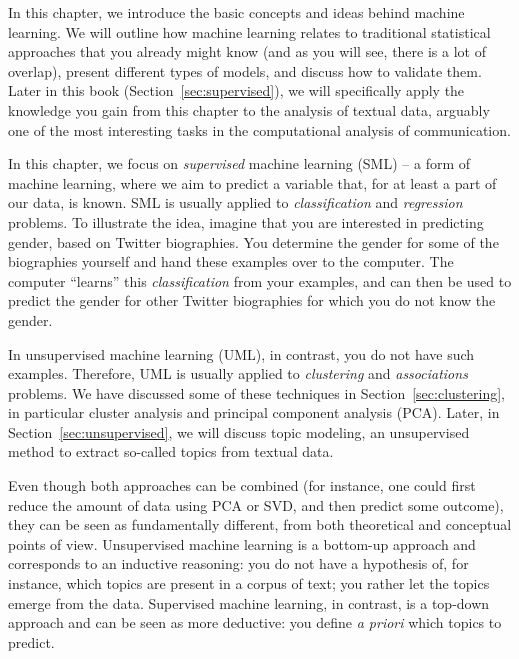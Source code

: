 In this chapter, we introduce the basic concepts and ideas behind
machine learning.  We will outline how machine learning relates to
traditional statistical approaches that you already might know (and as
you will see, there is a lot of overlap), present different types of
models, and discuss how to validate them.
Later in this book (Section~\ref{sec:supervised}), we will
specifically apply the knowledge you gain from this chapter to the
analysis of textual data, arguably one of the most interesting tasks
in the computational analysis of communication.

In this chapter, we focus on \emph{supervised} machine learning (SML)
-- a form of machine learning, where we aim to predict a variable
that, for at least a part of our data, is known. SML is usually applied to \textit{classification} and \textit{regression}  problems. To illustrate the 
idea, imagine that you are interested in predicting gender, based
on Twitter biographies. You determine the gender for some of the
biographies yourself and hand these examples over to the computer. The
computer ``learns'' this \textit{classification} from your examples, and can then be used to predict the gender for other Twitter biographies for which you do not
know the gender.

In unsupervised machine learning (UML), in contrast, you do not have such
examples. Therefore, UML is usually applied to \textit{clustering} and \textit{associations} problems. We have discussed some of these techniques in Section~\ref{sec:clustering}, in particular cluster analysis and
principal component analysis (PCA).
Later, in Section~\ref{sec:unsupervised}, we will discuss topic modeling, an unsupervised method to extract so-called topics from textual data.


Even though both approaches can be combined (for instance, one could
first reduce the amount of data using PCA or SVD, and then predict some
outcome), they can be seen as fundamentally different,  from both
theoretical and conceptual points of view.  Unsupervised machine
learning is a bottom-up approach and corresponds to an inductive
reasoning: you do not have a hypothesis of, for instance, which topics
are present in a corpus of text; you rather let the topics emerge from
the data.  Supervised machine learning, in contrast, is a top-down
approach and can be seen as more deductive: you define \emph{a priori} which
topics to predict.


%
